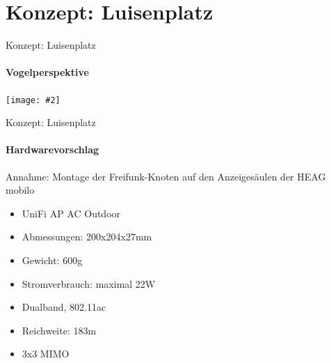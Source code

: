 \documentclass[]{beamer}
\newcommand{\centeredimage}[2][ ]{
        \begin{center}
            \texttt{[image: \#2]} $\;$

            \tiny{#1}
        \end{center}
}
\begin{document}
\section{Konzept: Luisenplatz}
\begin{frame}{Konzept: Luisenplatz}
\framesubtitle{Vogelperspektive}
\centeredimage{images/plan_luisenplatz1.jpg}
\end{frame}

\begin{frame}{Konzept: Luisenplatz}
\framesubtitle{Hardwarevorschlag}
Annahme: Montage der Freifunk-Knoten auf den Anzeigesäulen der HEAG mobilo \pause


\begin{minipage}{0.4\textwidth} 
\begin{itemize}
	\item UniFi AP AC Outdoor
	\item Abmessungen: 200x204x27mm
	\item Gewicht: 600g
	\item Stromverbrauch: maximal 22W
	\item Dualband, 802.11ac
	\item Reichweite: 183m
	\item 3x3 MIMO
\end{itemize}
\end{minipage}
\hfill
\pause
\begin{minipage}{0.4\textwidth}

\end{minipage}
\end{frame}
\end{document}
